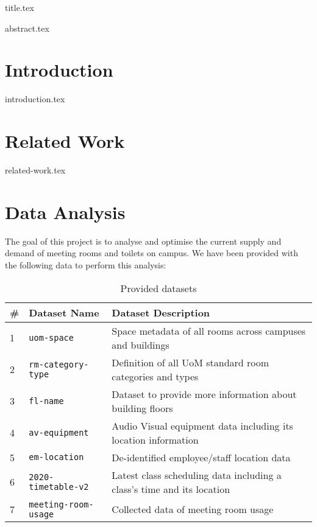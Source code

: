 \documentclass[a4paper, 11pt]{article}
\begin{document}
{title.tex}
\pagebreak

{abstract.tex}

\thispagestyle{empty}
\setcounter{tocdepth}{3}
\tableofcontents{}
\pagebreak

\setcounter{page}{1}

\section{Introduction}
{introduction.tex}
\clearpage

\section{Related Work}
{related-work.tex}
\clearpage

\section{Data Analysis}
The goal of this project is to analyse and optimise the current supply and demand of meeting rooms and toilets on campus. We have been provided with the following data to perform this analysis:

\begin{table}[H]
\centering
\begin{tabular}{|l|l|l|}
\hline
\# & \textbf{Dataset Name} & \textbf{Dataset Description}                                           \\ \hline
1  & \texttt{uom-space}             & Space metadata of all rooms across campuses and buildings              \\ \hline
2  & \texttt{rm-category-type}      & Definition of all UoM standard room categories and types               \\ \hline
3  & \texttt{fl-name}               & Dataset to provide more information about building floors              \\ \hline
4  & \texttt{av-equipment}         & Audio Visual equipment data including its location information         \\ \hline
5  & \texttt{em-location}           & De-identified employee/staff location data                             \\ \hline
6  & \texttt{2020-timetable-v2}     & Latest class scheduling data including a class's time and its location \\ \hline
7  & \texttt{meeting-room-usage}    & Collected data of meeting room usage                                   \\ \hline
\end{tabular}
\caption{Provided datasets}
\end{table}
\end{document}
